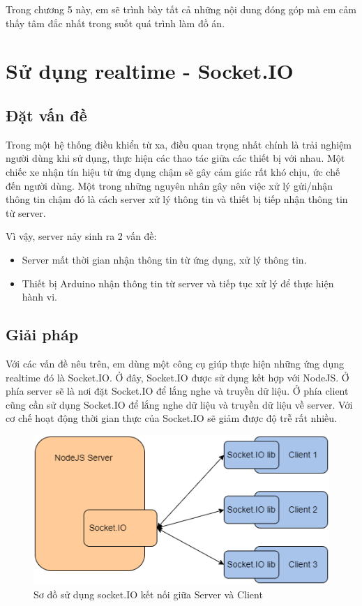 \documentclass[../DoAn.tex]{subfiles}
\begin{document}
Trong chương 5 này, em sẽ trình bày tất cả những nội dung đóng góp mà em cảm thấy tâm đắc nhất trong suốt quá trình làm đồ án.

\section{Sử dụng realtime - Socket.IO}
\subsection{Đặt vấn đề}

Trong một hệ thống điều khiển từ xa, điều quan trọng nhất chính là trải nghiệm người dùng khi sử dụng, thực hiện các thao tác giữa các thiết bị với nhau. Một chiếc xe nhận tín hiệu từ ứng dụng chậm sẽ gây cảm giác rất khó chịu, ức chế đến người dùng. Một trong những nguyên nhân gây nên việc xử lý gửi/nhận thông tin chậm đó là cách server xử lý thông tin và thiết bị tiếp nhận thông tin từ server.

Vì vậy, server nảy sinh ra 2 vấn đề:
\begin{itemize}
    \item Server mất thời gian nhận thông tin từ ứng dụng, xử lý thông tin.
    \item Thiết bị Arduino nhận thông tin từ server và tiếp tục xử lý để thực hiện hành vi.
\end{itemize}

\subsection{Giải pháp}
Với các vấn đề nêu trên, em dùng một công cụ giúp thực hiện những ứng dụng realtime đó là Socket.IO. Ở đây, Socket.IO được sử dụng kết hợp với NodeJS. Ở phía server sẽ là nơi đặt Socket.IO để lắng nghe và truyền dữ liệu. Ở phía client cũng cần sử dụng Socket.IO để lắng nghe dữ liệu và truyền dữ liệu về server. Với cơ chế hoạt động thời gian thực của Socket.IO sẽ giảm được độ trễ rất nhiều.

\begin{figure}[H]
    \centering
    \includegraphics[scale = 0.75]{Hinhve/socketio.png}
    \caption{Sơ đồ sử dụng socket.IO kết nối giữa Server và Client}
    \label{fig:Fig0}
\end{figure}
\end{document}
